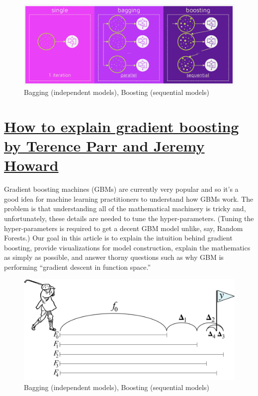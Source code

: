 \documentclass[]{book}
\theoremstyle{definition}
\theoremstyle{definition}
\theoremstyle{definition}
\theoremstyle{remark}
\begin{document}
\begin{figure}

{\centering \includegraphics[width=0.8\linewidth]{figures/bagging-boosting} 

}

\caption{Bagging (independent models), Boosting (sequential models)}\label{fig:bagging-boosting}
\end{figure}

\section{\texorpdfstring{\href{http://explained.ai/gradient-boosting/index.html}{How
to explain gradient boosting by Terence Parr and Jeremy
Howard}}{How to explain gradient boosting by Terence Parr and Jeremy Howard}}\label{how-to-explain-gradient-boosting-by-terence-parr-and-jeremy-howard}

Gradient boosting machines (GBMs) are currently very popular and so it's
a good idea for machine learning practitioners to understand how GBMs
work. The problem is that understanding all of the mathematical
machinery is tricky and, unfortunately, these details are needed to tune
the hyper-parameters. (Tuning the hyper-parameters is required to get a
decent GBM model unlike, say, Random Forests.) Our goal in this article
is to explain the intuition behind gradient boosting, provide
visualizations for model construction, explain the mathematics as simply
as possible, and answer thorny questions such as why GBM is performing
``gradient descent in function space.''

\begin{figure}

{\centering \includegraphics[width=0.8\linewidth]{figures/golf-dir-vector} 

}

\caption{Bagging (independent models), Boosting (sequential models)}\label{fig:golf-dir-vector}
\end{figure}
\end{document}
